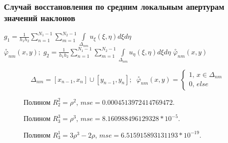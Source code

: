 \documentclass{article}
\begin{document}
\subsubsection{Случай восстановления по средним локальным апертурам значений наклонов}
$g_1 = \frac{1}{h_1h_2} \sum \limits_{n=1}^{N_1 - 1} \sum \limits_{m=1}^{N_2 - 1} \int \limits _{\Delta_{nm}} u_\xi(\xi,\eta) d\xi d\eta$ $\overset{\circ}{\varphi}_{nm}(x,y);\;g_2 = \frac{1}{h_1h_2} \sum \limits_{n=1}^{N_1 - 1} \sum \limits_{m=1}^{N_2 - 1} \int \limits _{\Delta_{nm}} u_\eta(\xi,\eta) d\xi d\eta$ $\overset{\circ}{\varphi}_{nm}(x,y)$ 

$$\Delta_{nm} = [x_{n-1}, x_n] \cup [y_{n-1}, y_n];\;\;\overset{\circ}{\varphi}_{nm}(x,y) = \begin{cases} 1, \, x \in \Delta_{nm} \\ 0, \, else\end{cases}$$
\begin{figure}[H]
\caption{Полином $R_2^2 = \rho^2$, $mse = 0.0004513972414769472$.}
\end{figure}

\begin{figure}[H]
\caption{Полином $R_3^3 = \rho^3$, $mse = 8.160988496129328*10^{-5}$.}
\end{figure}

\begin{figure}[H]
\caption{Полином $R_3^1 = 3\rho^3 - 2\rho$, $mse = 6.515915893131193*10^{-19}$.}
\end{figure}
\end{document}
